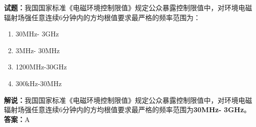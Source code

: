 \documentclass{ctexbook}
\begin{document}
%


%
%


\noindent\textbf{试题：}我国国家标准《电磁环境控制限值》规定公众暴露控制限值中，对环境电磁辐射场强任意连续6分钟内的方均根值要求最严格的频率范围为： 
\begin{enumerate}[leftmargin=3em]
	\item 30MHz- 3GHz
	\item 3MHz- 30MHz
	\item 1200MHz-30GHz
	\item 300kHz-30MHz
\end{enumerate}
\noindent\textbf{解说：}我国国家标准《电磁环境控制限值》规定公众暴露控制限值中，对环境电磁辐射场强任意连续6分钟内的方均根值要求最严格的频率范围为\textbf{30MHz- 3GHz}。\\
\textbf{答案：}A
\end{document}
